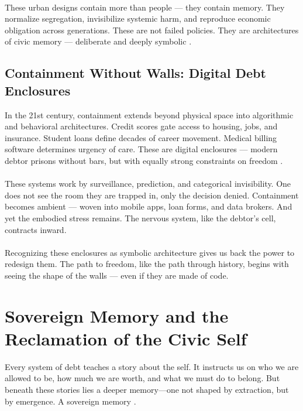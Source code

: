\documentclass[12pt]{article}
\begin{document}
\paragraph{} These urban designs contain more than people — they contain memory. They normalize segregation, invisibilize systemic harm, and reproduce economic obligation across generations. These are not failed policies. They are architectures of civic memory — deliberate and deeply symbolic \parencite{gilmore2007golden}.

\subsection{Containment Without Walls: Digital Debt Enclosures}

In the 21st century, containment extends beyond physical space into algorithmic and behavioral architectures. Credit scores gate access to housing, jobs, and insurance. Student loans define decades of career movement. Medical billing software determines urgency of care. These are digital enclosures — modern debtor prisons without bars, but with equally strong constraints on freedom \parencite{eubanks2018automating}.

\paragraph{} These systems work by surveillance, prediction, and categorical invisibility. One does not see the room they are trapped in, only the decision denied. Containment becomes ambient — woven into mobile apps, loan forms, and data brokers. And yet the embodied stress remains. The nervous system, like the debtor's cell, contracts inward.

\paragraph{} Recognizing these enclosures as symbolic architecture gives us back the power to redesign them. The path to freedom, like the path through history, begins with seeing the shape of the walls — even if they are made of code.


\section{Sovereign Memory and the Reclamation of the Civic Self}

Every system of debt teaches a story about the self. It instructs us on who we are allowed to be, how much we are worth, and what we must do to belong. But beneath these stories lies a deeper memory—one not shaped by extraction, but by emergence. A sovereign memory \cite{ahmed2004cultural}.
\end{document}
